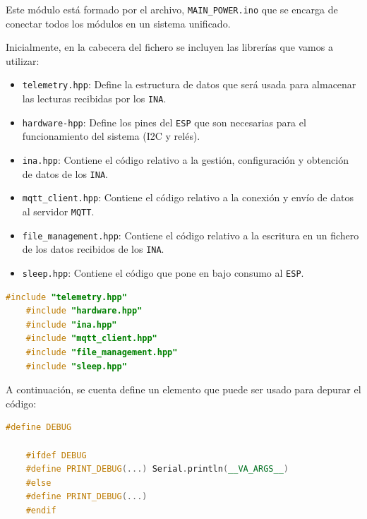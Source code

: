 Este módulo está formado por el archivo, \texttt{MAIN\_POWER.ino} que se encarga de conectar todos los módulos en un sistema unificado.

Inicialmente, en la cabecera del fichero se incluyen las librerías que vamos a utilizar:
\begin{itemize}
    \item \texttt{telemetry.hpp}: Define la estructura de datos que será usada para almacenar las lecturas recibidas por los \texttt{INA}.
    \item \texttt{hardware-hpp}: Define los pines del \texttt{ESP} que son necesarias para el funcionamiento del sistema (I2C y relés).
    \item \texttt{ina.hpp}: Contiene el código relativo a la gestión, configuración y obtención de datos de los \texttt{INA}. 
    \item \texttt{mqtt\_client.hpp}: Contiene el código relativo a la conexión y envío de datos al servidor \texttt{MQTT}.
    \item \texttt{file\_management.hpp}: Contiene el código relativo a la escritura en un fichero de los datos recibidos de los \texttt{INA}.
    \item \texttt{sleep.hpp}: Contiene el código que pone en bajo consumo al \texttt{ESP}.
\end{itemize}

\begin{lstlisting}[captionpos=b, caption={Cabecera con los módulos y ficheros utilizados}, language=c++]
    #include "telemetry.hpp"
    #include "hardware.hpp"
    #include "ina.hpp"
    #include "mqtt_client.hpp"
    #include "file_management.hpp"
    #include "sleep.hpp"
\end{lstlisting}

A continuación, se cuenta define un elemento que puede ser usado para depurar el código:
\begin{lstlisting}[captionpos=b, caption={Definición del debuger}, language=c++]
    #define DEBUG

    #ifdef DEBUG
    #define PRINT_DEBUG(...) Serial.println(__VA_ARGS__)
    #else
    #define PRINT_DEBUG(...)
    #endif    
\end{lstlisting}

